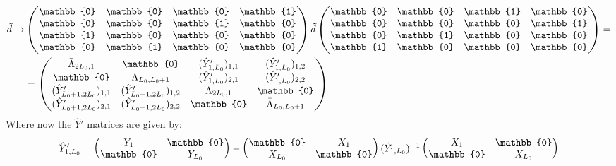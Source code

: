 \begin{equation}
\begin{split}
        \Tilde{d} \to & \begin{pmatrix}
            \mathbb{0} & \mathbb{0} & \mathbb{0} & \mathbb{1} \\
            \mathbb{0} & \mathbb{0} & \mathbb{1} & \mathbb{0} \\
            \mathbb{1} & \mathbb{0} & \mathbb{0} & \mathbb{0} \\
            \mathbb{0} & \mathbb{1} & \mathbb{0} & \mathbb{0} \\
        \end{pmatrix} \Tilde{d} \begin{pmatrix}
            \mathbb{0} & \mathbb{0} & \mathbb{1} & \mathbb{0} \\
            \mathbb{0} & \mathbb{0} & \mathbb{0} & \mathbb{1} \\
            \mathbb{0} & \mathbb{1} & \mathbb{0} & \mathbb{0} \\
            \mathbb{1} & \mathbb{0} & \mathbb{0} & \mathbb{0} \\
        \end{pmatrix} = \\ &= \begin{pmatrix}
        \Bar{\Lambda}_{2L_0, 1} & \mathbb{0} & (\hat{Y}'_{1, L_0})_{1,1} & (\hat{Y}'_{1, L_0})_{1,2} \\
        \mathbb{0} & \Lambda_{L_0, L_0 + 1} & (\hat{Y}'_{1, L_0})_{2,1} & (\hat{Y}'_{1, L_0})_{2,2} \\
        (\hat{Y}'_{L_0 + 1, 2L_0})_{1,1} & (\hat{Y}'_{L_0 + 1, 2L_0})_{1,2} & \Lambda_{2L_0, 1} & \mathbb{0} \\
        (\hat{Y}'_{L_0 + 1, 2L_0})_{2,1} & (\hat{Y}'_{L_0 + 1, 2L_0})_{2,2} & \mathbb{0} & \Bar{\Lambda}_{L_0, L_0 + 1}
    \end{pmatrix}
    \end{split}
\end{equation}
Where now the $\hat{Y}'$ matrices are given by:
\begin{equation}
    \Hat{Y}'_{1, L_0} = \begin{pmatrix}
        Y_{1} & \mathbb{0} \\
        \mathbb{0} & Y_{L_0}
    \end{pmatrix} - \begin{pmatrix}
        \mathbb{0} & X_1 \\
        X_{L_0} &  \mathbb{0} \\
    \end{pmatrix} (\Dot{Y}_{1, L_0})^{-1} \begin{pmatrix}
        X_1 & \mathbb{0} \\
        \mathbb{0} & X_{L_0} \\
    \end{pmatrix}
\end{equation}
